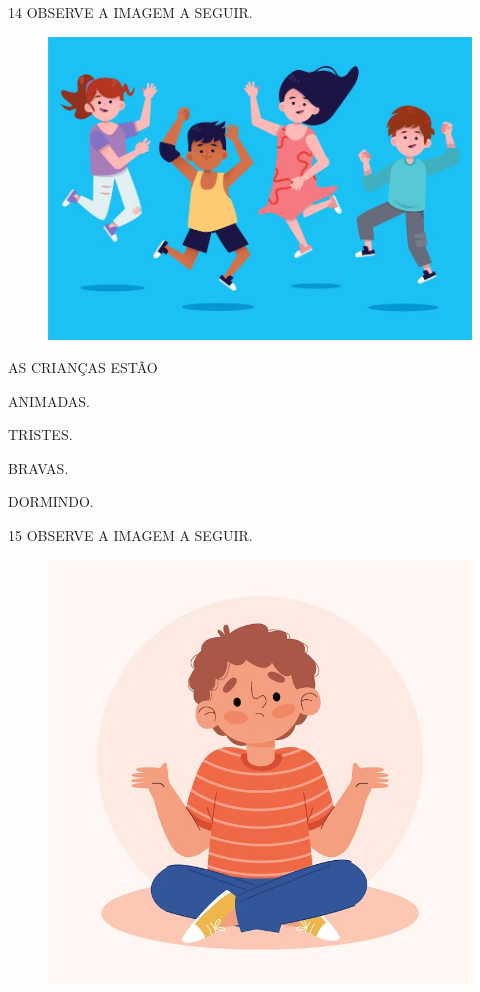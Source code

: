 \num{14} OBSERVE A IMAGEM A SEGUIR.

\begin{figure}[H]
\centering
\includegraphics[width=.7\textwidth]{./media/image219.png}
\end{figure}

AS CRIANÇAS ESTÃO

\begin{escolha}

\item ANIMADAS.

\item TRISTES.

\item BRAVAS.

\item DORMINDO.

\end{escolha}

\num{15} OBSERVE A IMAGEM A SEGUIR.

\begin{figure}[H]
\centering
\includegraphics[width=.7\textwidth]{./media/image220.png}
\end{figure}

